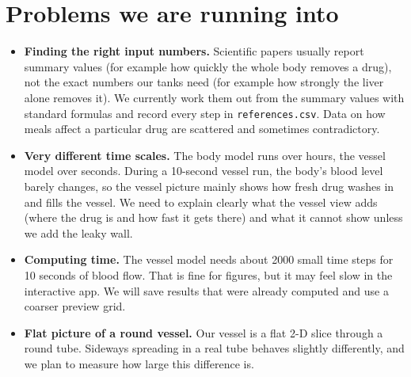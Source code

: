 \documentclass[10.5pt]{article}
\begin{document}
\section{Problems we are running into}
\begin{itemize}
\item \textbf{Finding the right input numbers.} Scientific papers usually report summary values (for example how quickly
the whole body removes a drug), not the exact numbers our tanks need (for example how strongly the liver alone
removes it). We currently work them out from the summary values with standard formulas and record every step in
\texttt{references.csv}. Data on how meals affect a particular drug are scattered and sometimes contradictory.
\item \textbf{Very different time scales.} The body model runs over hours, the vessel model over seconds. During a
10-second vessel run, the body's blood level barely changes, so the vessel picture mainly shows how fresh drug
washes in and fills the vessel. We need to explain clearly what the vessel view adds (where the drug is and how fast
it gets there) and what it cannot show unless we add the leaky wall.
\item \textbf{Computing time.} The vessel model needs about 2000 small time steps for 10 seconds of blood flow. That
is fine for figures, but it may feel slow in the interactive app. We will save results that were already computed
and use a coarser preview grid.
\item \textbf{Flat picture of a round vessel.} Our vessel is a flat 2-D slice through a round tube. Sideways spreading
in a real tube behaves slightly differently, and we plan to measure how large this difference is.
\end{itemize}

\end{document}
